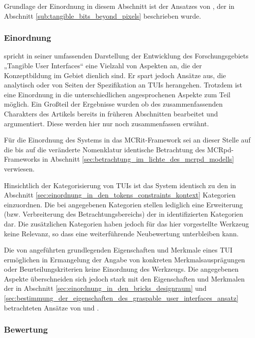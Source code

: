 Grundlage der Einordnung in diesem Abschnitt ist der Ansatzes von \citep{Ishii08}, der in Abschnitt \ref{sub:tangible_bits_beyond_pixels} beschrieben wurde.

\subsubsection{Einordnung}

\citet{Ishii08} spricht in seiner umfassenden Darstellung der Entwicklung des Forschungsgebiets „Tangible User Interfaces“ eine Vielzahl von Aspekten an, die der Konzeptbildung im Gebiet dienlich sind. Er spart jedoch Ansätze aus, die analytisch oder von Seiten der Spezifikation an \glspl{TUI} herangehen. Trotzdem ist eine Einordnung in die unterschiedlichen angesprochenen Aspekte zum Teil möglich. Ein Großteil der Ergebnisse wurden ob des zusammenfassenden Charakters des Artikels bereits in früheren Abschnitten bearbeitet und argumentiert. Diese werden hier nur noch zusammenfassen erwähnt.

Für die Einordnung des Systems in das \gls{MCRit}-Framework sei an dieser Stelle auf die bis auf die veränderte Nomenklatur identische Betrachtung des \gls{MCRpd}-Frameworks in Abschnitt \ref{sec:betrachtung_im_lichte_des_mcrpd_modells} verwiesen.

Hinsichtlich der Kategorisierung von \glspl{TUI} ist das System identisch zu den in Abschnitt \ref{sec:einordnung_in_den_tokens_constraints_kontext} Kategorien einzuordnen. Die bei \citep{Ishii08} angegebenen Kategorien stellen lediglich eine Erweiterung (bzw. Verbreiterung des Betrachtungsbereichs) der in \citep{Ullmer05} identifizierten Kategorien dar. Die zusätzlichen Kategorien haben jedoch für das hier vorgestellte Werkzeug keine Relevanz, so dass eine weiterführende Neubewertung unterbleiben kann.

Die von \citeauthor{Ishii08} angeführten grundlegenden Eigenschaften und Merkmale eines \gls{TUI} ermöglichen in Ermangelung der Angabe von konkreten Merkmalsausprägungen oder Beurteilungskriterien keine Einordnung des Werkzeugs. Die angegebenen Aspekte überschneiden sich jedoch stark mit den Eigenschaften und Merkmalen der in Abschnitt \ref{sec:einordnung_in_den_bricks_designraum} und \ref{sec:bestimmung_der_eigenschaften_des_graspable_user_interfaces_ansatz} betrachteten Ansätze von \citep{Fitzmaurice95} und \citep{Fitzmaurice96}.

\subsubsection{Bewertung}

